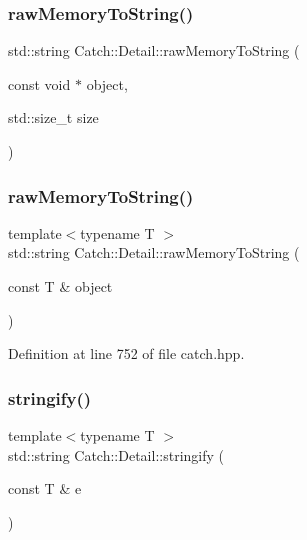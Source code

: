 \subsubsection{\texorpdfstring{raw\+Memory\+To\+String()}{rawMemoryToString()}\hspace{0.1cm}{\footnotesize\ttfamily [1/2]}}
{\footnotesize\ttfamily std\+::string Catch\+::\+Detail\+::raw\+Memory\+To\+String (\begin{DoxyParamCaption}\item[{const void $\ast$}]{object,  }\item[{std\+::size\+\_\+t}]{size }\end{DoxyParamCaption})}

\mbox{\label{namespace_catch_1_1_detail_a371620ed524abfcae5c3772bf49b563a}} 
\subsubsection{\texorpdfstring{raw\+Memory\+To\+String()}{rawMemoryToString()}\hspace{0.1cm}{\footnotesize\ttfamily [2/2]}}
{\footnotesize\ttfamily template$<$typename T $>$ \\
std\+::string Catch\+::\+Detail\+::raw\+Memory\+To\+String (\begin{DoxyParamCaption}\item[{const T \&}]{object }\end{DoxyParamCaption})}



Definition at line 752 of file catch.\+hpp.

\mbox{\label{namespace_catch_1_1_detail_af0ad48344ffd3f92f3568465248a9880}} 
\subsubsection{\texorpdfstring{stringify()}{stringify()}}
{\footnotesize\ttfamily template$<$typename T $>$ \\
std\+::string Catch\+::\+Detail\+::stringify (\begin{DoxyParamCaption}\item[{const T \&}]{e }\end{DoxyParamCaption})}



